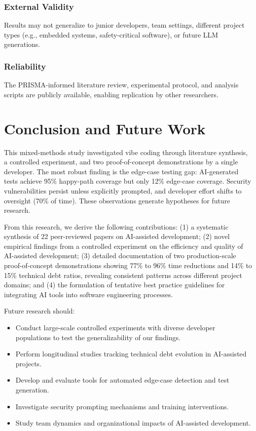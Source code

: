 \documentclass[sigconf]{acmart}
\begin{document}
\subsubsection{External Validity}
Results may not generalize to junior developers, team settings, different project types (e.g., embedded systems, safety-critical software), or future LLM generations.

\subsubsection{Reliability}
The PRISMA-informed literature review, experimental protocol, and analysis scripts are publicly available, enabling replication by other researchers.

\section{Conclusion and Future Work}

This mixed-methods study investigated vibe coding through literature synthesis, a controlled experiment, and two proof-of-concept demonstrations by a single developer. The most robust finding is the edge-case testing gap: AI-generated tests achieve 95\% happy-path coverage but only 12\% edge-case coverage. Security vulnerabilities persist unless explicitly prompted, and developer effort shifts to oversight (70\% of time). These observations generate hypotheses for future research.

From this research, we derive the following contributions: (1) a systematic synthesis of 22 peer-reviewed papers on AI-assisted development; (2) novel empirical findings from a controlled experiment on the efficiency and quality of AI-assisted development; (3) detailed documentation of two production-scale proof-of-concept demonstrations showing 77\% to 96\% time reductions and 14\% to 15\% technical debt ratios, revealing consistent patterns across different project domains; and (4) the formulation of tentative best practice guidelines for integrating AI tools into software engineering processes.

Future research should:
\begin{itemize}
    \item Conduct large-scale controlled experiments with diverse developer populations to test the generalizability of our findings.
    \item Perform longitudinal studies tracking technical debt evolution in AI-assisted projects.
    \item Develop and evaluate tools for automated edge-case detection and test generation.
    \item Investigate security prompting mechanisms and training interventions.
    \item Study team dynamics and organizational impacts of AI-assisted development.
\end{itemize}
\end{document}

